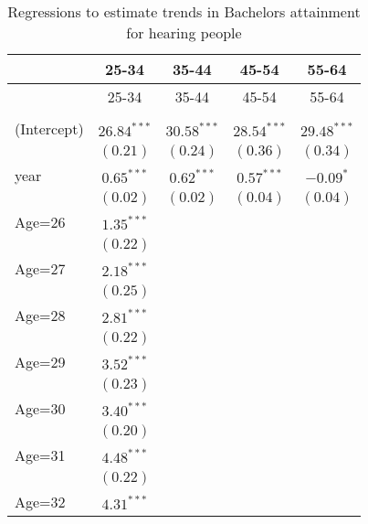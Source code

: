 \documentclass[fullpage]{paper}
\begin{document}
\begin{center}
\begin{longtable}{l c c c c }
\hline
 & 25-34 & 35-44 & 45-54 & 55-64 \\
\hline
\endfirsthead
\hline
 & 25-34 & 35-44 & 45-54 & 55-64 \\
\hline
\endhead
\hline
\endfoot
\hline
\multicolumn{5}{l}{\scriptsize{$^{***}p<0.001$, $^{**}p<0.01$, $^*p<0.05$}}\\
\caption{Regressions to estimate trends in Bachelors attainment for hearing people}
\label{table:coefficients}
\endlastfoot
(Intercept) & $26.84^{***}$ & $30.58^{***}$ & $28.54^{***}$ & $29.48^{***}$ \\
            & $(0.21)$      & $(0.24)$      & $(0.36)$      & $(0.34)$      \\
year        & $0.65^{***}$  & $0.62^{***}$  & $0.57^{***}$  & $-0.09^{*}$   \\
            & $(0.02)$      & $(0.02)$      & $(0.04)$      & $(0.04)$      \\
Age=26      & $1.35^{***}$  &               &               &               \\
            & $(0.22)$      &               &               &               \\
Age=27      & $2.18^{***}$  &               &               &               \\
            & $(0.25)$      &               &               &               \\
Age=28      & $2.81^{***}$  &               &               &               \\
            & $(0.22)$      &               &               &               \\
Age=29      & $3.52^{***}$  &               &               &               \\
            & $(0.23)$      &               &               &               \\
Age=30      & $3.40^{***}$  &               &               &               \\
            & $(0.20)$      &               &               &               \\
Age=31      & $4.48^{***}$  &               &               &               \\
            & $(0.22)$      &               &               &               \\
Age=32      & $4.31^{***}$  &               &               &               \\

\end{longtable}
\end{center}
\end{document}
